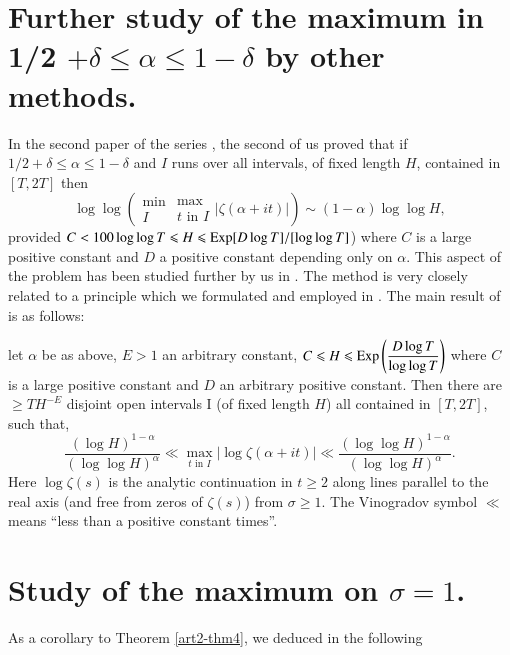 \section{Further study of the maximum in 1/2 $+ \delta \leqslant \alpha \leqslant 1 -\delta$ by other methods.}\label{art2-sec3}
In the second paper of the series \cite{art2-key12}, the second of us proved that if $1/2 + \delta \leqslant \alpha \leqslant 1-\delta$ and $I$ runs over all intervals, of fixed length $H$, contained in $[T, 2T]$ then 
$$
\log \log \left(\begin{matrix}
\min\\
I
\end{matrix} 
\begin{matrix}
\max\\
t \text{ in } I
\end{matrix}
|\zeta (\alpha + it)|
\right) \sim (1-\alpha) \log \log H,
$$
provided $C < 100 \log \log T \leqslant H \leqslant \operatorname{Exp} [D \log T]/[\log \log T]$) where $C$ is a large positive constant and $D$ a positive constant depending only on $\alpha$. This aspect of the problem has been studied further by us in \cite{art2-key2}. The method is very closely related to a principle which we formulated and employed in \cite{art2-key6}. The main result of \cite{art2-key3} is as follows:


\begin{theorem}\label{art2-thm4}
let $\alpha$ be as above, $E>1$ an arbitrary constant,  $C \leqslant H \leqslant \operatorname{Exp} \left(\dfrac{D \log T}{\log \log T} \right)$ where $C$ is a large positive constant and $D$ an arbitrary positive constant. Then there are $\geqslant TH^{-E}$ disjoint open intervals I (of fixed length $H$) all contained in $[T, 2T]$, such that, 
$$
\frac{(\log H)^{1-\alpha}}{(\log \log H)^\alpha} \ll \max\limits_{t \text{ in } I} |\log \zeta (\alpha + it)| \ll \frac{(\log \log H)^{1-\alpha}}{(\log \log H)^\alpha}.
$$
Here $\log \zeta(s)$ is the analytic continuation in $t \geqslant 2$ along lines parallel to the real axis (and free from zeros of $\zeta(s)$) from $\sigma \geqslant 1$. The Vinogradov symbol $\ll$ means ``less than a positive constant times''.
\end{theorem}

\section{Study of the maximum on $\sigma =1$.}\label{art2-sec4}\pageoriginale 
As a corollary to Theorem \ref{art2-thm4}, we deduced in \cite{art2-key4} the following

